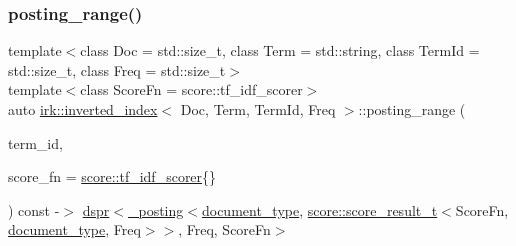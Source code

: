 \mbox{\label{classirk_1_1inverted__index_adde74983c6f5bab062296561b3b0b010}} 
\subsubsection{\texorpdfstring{posting\+\_\+range()}{posting\_range()}\hspace{0.1cm}{\footnotesize\ttfamily [2/2]}}
{\footnotesize\ttfamily template$<$class Doc  = std\+::size\+\_\+t, class Term  = std\+::string, class Term\+Id  = std\+::size\+\_\+t, class Freq  = std\+::size\+\_\+t$>$ \\
template$<$class Score\+Fn  = score\+::tf\+\_\+idf\+\_\+scorer$>$ \\
auto \mbox{\hyperlink{classirk_1_1inverted__index}{irk\+::inverted\+\_\+index}}$<$ Doc, Term, Term\+Id, Freq $>$\+::posting\+\_\+range (\begin{DoxyParamCaption}\item[{\mbox{\hyperlink{classirk_1_1inverted__index_aac7579f5261c795a6f19a7f700b57b2b}{term\+\_\+id\+\_\+type}}}]{term\+\_\+id,  }\item[{Score\+Fn}]{score\+\_\+fn = {\ttfamily \mbox{\hyperlink{structirk_1_1score_1_1tf__idf__scorer}{score\+::tf\+\_\+idf\+\_\+scorer}}\{\}} }\end{DoxyParamCaption}) const -\/$>$ \mbox{\hyperlink{namespaceirk_af92c7aae439f59ccae252f027f851c24}{dspr}}$<$\mbox{\hyperlink{structirk_1_1__posting}{\+\_\+posting}}$<$\mbox{\hyperlink{classirk_1_1inverted__index_ab708a9d1605de705341f3ed81bd7d5e7}{document\+\_\+type}},
                    \mbox{\hyperlink{namespaceirk_1_1score_af4a2c84b3548a4ac12aac3862bc94875}{score\+::score\+\_\+result\+\_\+t}}$<$Score\+Fn, \mbox{\hyperlink{classirk_1_1inverted__index_ab708a9d1605de705341f3ed81bd7d5e7}{document\+\_\+type}}, Freq$>$$>$,
            Freq,
            Score\+Fn$>$
    \hspace{0.3cm}{\ttfamily [inline]}}

\mbox{\label{classirk_1_1inverted__index_ada3586a485b42d220669d319f6b5acc4}} 

